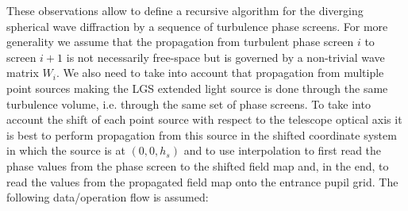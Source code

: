 These observations allow to define a recursive algorithm for the diverging
spherical wave diffraction by a sequence of turbulence phase screens. For more
generality we assume that the propagation from turbulent phase screen $i$ to
screen $i+1$ is not necessarily free-space but is governed by a non-trivial
wave matrix $W_{i}$. We also need to take into account that propagation from
multiple point sources making the LGS extended light source is done through
the same turbulence volume, i.e. through the same set of phase screens. To
take into account the shift of each point source with respect to the telescope
optical axis it is best to perform propagation from this source in the shifted
coordinate system in which the source is at $(0,0,h_{s})$ and to use
interpolation to first read the phase values from the phase screen to the
shifted field map and, in the end, to read the values from the propagated
field map onto the entrance pupil grid. The following data/operation flow is
assumed:
